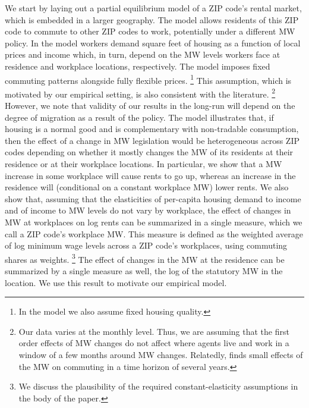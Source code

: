 We start by laying out a partial equilibrium model of a ZIP code's rental market,
which is embedded in a larger geography.
The model allows residents of this ZIP code to commute to other ZIP codes to 
work, potentially under a different MW policy.
In the model workers demand square feet of housing as a function of local prices 
and income which, in turn, depend on the MW levels workers face at residence and 
workplace locations, respectively.
The model imposes fixed commuting patterns alongside fully flexible prices.%
\footnote{In the model we also assume fixed housing quality.}
This assumption, which is motivated by our empirical setting, is also consistent 
with the literature.%
\footnote{Our data varies at the monthly level. 
Thus, we are assuming that the first order effects of MW changes do not affect 
where agents live and work in a window of a few months around MW changes.
Relatedly, \parencite{PerezPerez2021} finds small effects of the MW on commuting
in a time horizon of several years.}
However, we note that validity of our results in the long-run will depend on the
degree of migration as a result of the policy.
The model illustrates that, if housing is a normal good and is complementary 
with non-tradable consumption, then the effect of a change in MW legislation 
would be heterogeneous across ZIP codes depending on whether it mostly changes 
the MW of its residents at their residence or at their workplace locations.
In particular, we show that a MW increase in some workplace will cause rents to 
go up, whereas an increase in the residence will (conditional on a constant 
workplace MW) lower rents.
We also show that, assuming that the elasticities of per-capita housing demand 
to income and of income to MW levels do not vary by workplace, the effect of 
changes in MW at workplaces on log rents can be summarized in a single measure, 
which we call a ZIP code's workplace MW.
This measure is defined as the weighted average of log minimum wage levels 
across a ZIP code's workplaces, using commuting shares as weights.%
\footnote{We discuss the plausibility of the required constant-elasticity 
assumptions in the body of the paper.}
The effect of changes in the MW at the residence can be summarized by
a single measure as well, the log of the statutory MW in the location.
We use this result to motivate our empirical model.


